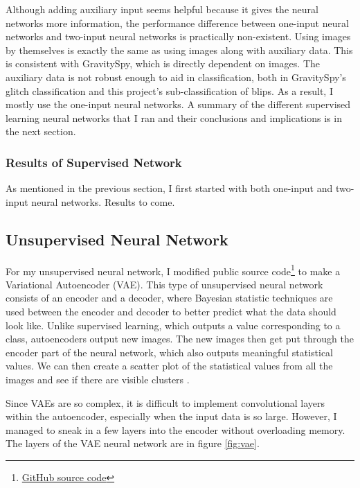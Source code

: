 \documentclass[a4paper]{article}
\begin{document}
Although adding auxiliary input seems helpful because it gives the neural networks more information, the performance difference between one-input neural networks and two-input neural networks is practically non-existent. Using images by themselves is exactly the same as using images along with auxiliary data. This is consistent with GravitySpy, which is directly dependent on images. The auxiliary data is not robust enough to aid in classification, both in GravitySpy's glitch classification and this project's sub-classification of blips. As a result, I mostly use the one-input neural networks. A summary of the different supervised learning neural networks that I ran and their conclusions and implications is in the next section.

\subsubsection{Results of Supervised Network}

As mentioned in the previous section, I first started with both one-input and two-input neural networks. Results to come.

\subsection{Unsupervised Neural Network}

For my unsupervised neural network, I modified public source code\footnote{\href{https://github.com/keras-team/keras/blob/master/examples/variational_autoencoder.py}{GitHub source code}} to make a Variational Autoencoder (VAE). This type of unsupervised neural network consists of an encoder and a decoder, where Bayesian statistic techniques are used between the encoder and decoder to better predict what the data should look like. Unlike supervised learning, which outputs a value corresponding to a class, autoencoders output new images. The new images then get put through the encoder part of the neural network, which also outputs meaningful statistical values. We can then create a scatter plot of the statistical values from all the images and see if there are visible clusters \cite{Kingma:2013}. 

Since VAEs are so complex, it is difficult to implement convolutional layers within the autoencoder, especially when the input data is so large. However, I managed to sneak in a few layers into the encoder without overloading memory. The layers of the VAE neural network are in figure \ref{fig:vae}.
\end{document}
